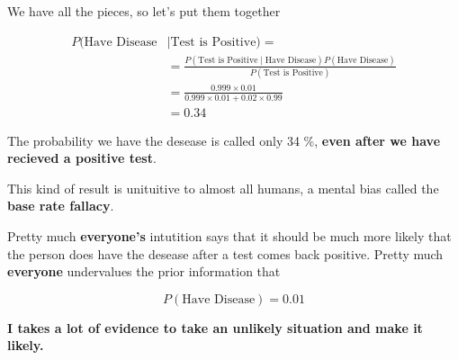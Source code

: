 \begin{frame}

We have all the pieces, so let's put them together

\begin{align*}
P(\text{Have Disease}  & \mid \text{Test is Positive)} = \\
%
&= \frac{  P(\text{Test is
Positive} \mid \text{Have Disease}) P(\text{Have Disease}) } { P(\text{Test is
Positive}) } \\
%
&= \frac{ 0.999 \times 0.01 } {  0.999 \times 0.01 +  0.02 \times 0.99 } \\
%
&= 0.34
\end{align*}

The probability we have the desease is called only 34 \%, \textbf{even after we
have recieved a positive test}.

\end{frame}
%

%
\begin{frame}

This kind of result is unituitive to almost all humans, a mental bias called the
\textbf{base rate fallacy}.

Pretty much \textbf{everyone's} intutition says that it should be much more
likely that the person does have the desease after a test comes back positive.
Pretty much \textbf{everyone} undervalues the prior information that

$$ P(\text{Have Disease}) = 0.01 $$

\textbf{I takes a lot of evidence to take an unlikely situation and make it
likely.}

\end{frame}
